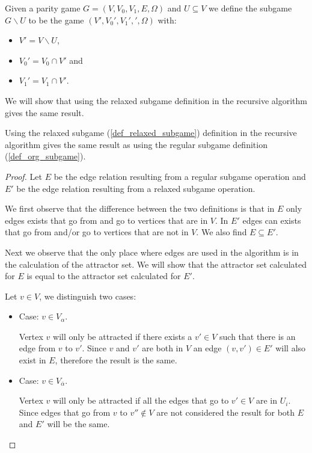 \begin{definition}
	\label{def_relaxed_subgame}
	Given a parity game $G = (V,V_0,V_1, E,\Omega)$ and $U \subseteq V$ we define the subgame $G \backslash U$ to be the game $(V', V_0', V_1', ', \Omega)$ with:
	\begin{itemize}
		\item $V' = V \backslash U$,
		\item $V_0' = V_0 \cap V'$ and
		\item $V_1' = V_1 \cap V'$.
	\end{itemize}
\end{definition}
We will show that using the relaxed subgame definition in the recursive algorithm gives the same result.
\begin{lemma}
	Using the relaxed subgame (\ref{def_relaxed_subgame}) definition in the recursive algorithm gives the same result as using the regular subgame definition (\ref{def_org_subgame}).
	\begin{proof}
		Let $E$ be the edge relation resulting from a regular subgame operation and $E'$ be the edge relation resulting from a relaxed subgame operation.
		
		We first observe that the difference between the two definitions is that in $E$ only edges exists that go from and go to vertices that are in $V$. In $E'$ edges can exists that go from and/or go to vertices that are not in $V$. We also find $E \subseteq E'$.
		
		Next we observe that the only place where edges are used in the algorithm is in the calculation of the attractor set. We will show that the attractor set calculated for $E$ is equal to the attractor set calculated for $E'$.
		
		Let $v \in V$, we distinguish two cases:
		\begin{itemize}
			\item Case: $v \in V_\alpha$.
			
			Vertex $v$ will only be attracted if there exists a $v' \in V$ such that there is an edge from $v$ to $v'$. Since $v$ and $v'$ are both in $V$ an edge $(v,v') \in E'$ will also exist in $E$, therefore the result is the same.
			\item Case: $v \in V_{\overline{\alpha}}$.
			
		    Vertex $v$ will only be attracted if all the edges that go to $v' \in V$ are in $U_i$. Since edges that go from $v$ to $v'' \notin V$ are not considered the result for both $E$ and $E'$ will be the same.
		\end{itemize}
	\end{proof}
\end{lemma}

